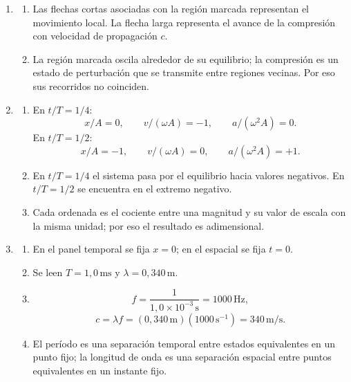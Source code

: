 \begin{enumerate}[label=\textbf{R\arabic*.},leftmargin=*]
    \item
    \begin{enumerate}[label=\alph*)]
        \item Las flechas cortas asociadas con la región marcada representan
        el movimiento local. La flecha larga representa el avance de la
        compresión con velocidad de propagación \(c\).
        \item La región marcada oscila alrededor de su equilibrio; la
        compresión es un estado de perturbación que se transmite entre
        regiones vecinas. Por eso sus recorridos no coinciden.
    \end{enumerate}

    \item
    \begin{enumerate}[label=\alph*)]
        \item En \(t/T=1/4\):
        \[
            x/A=0,\qquad v/(\omega A)=-1,\qquad
            a/(\omega^{2}A)=0.
        \]
        En \(t/T=1/2\):
        \[
            x/A=-1,\qquad v/(\omega A)=0,\qquad
            a/(\omega^{2}A)=+1.
        \]
        \item En \(t/T=1/4\) el sistema pasa por el equilibrio hacia valores
        negativos. En \(t/T=1/2\) se encuentra en el extremo negativo.
        \item Cada ordenada es el cociente entre una magnitud y su valor de
        escala con la misma unidad; por eso el resultado es adimensional.
    \end{enumerate}

    \item
    \begin{enumerate}[label=\alph*)]
        \item En el panel temporal se fija \(x=0\); en el espacial se fija
        \(t=0\).
        \item Se leen \(T=1{,}0\,\text{ms}\) y
        \(\lambda=0{,}340\,\text{m}\).
        \item
        \[
            f=\frac{1}{1{,}0\times10^{-3}\,\text{s}}
              =1000\,\text{Hz},
        \]
        \[
            c=\lambda f
              =(0{,}340\,\text{m})(1000\,\text{s}^{-1})
              =340\,\text{m}/\text{s}.
        \]
        \item El período es una separación temporal entre estados
        equivalentes en un punto fijo; la longitud de onda es una separación
        espacial entre puntos equivalentes en un instante fijo.
    \end{enumerate}


\end{enumerate}
